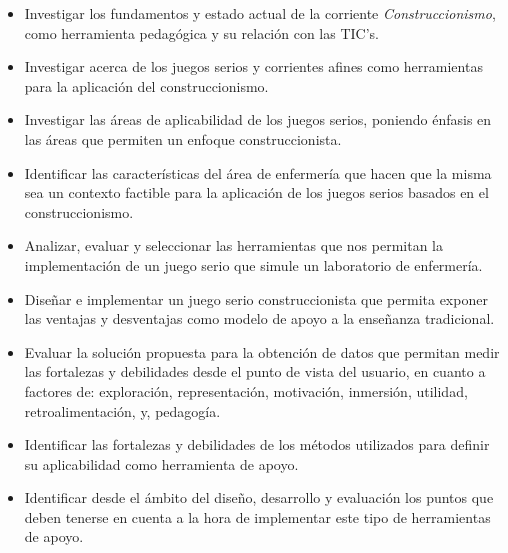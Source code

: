 \begin{itemize}
    \item Investigar los fundamentos y estado actual de la corriente
        \emph{Construccionismo}, como herramienta pedagógica y su relación con
        las TIC's.

    \item Investigar acerca de los juegos serios y corrientes afines como
        herramientas para la aplicación del construccionismo.
    
    \item Investigar las áreas de aplicabilidad de los juegos serios, poniendo
        énfasis en las áreas que permiten un enfoque construccionista.
        
    \item Identificar las características del área de enfermería que hacen que
        la misma sea un contexto factible para la aplicación de los juegos
        serios basados en el construccionismo.
    
    \item Analizar, evaluar y seleccionar las herramientas que nos permitan la
        implementación de un juego serio que simule un laboratorio de
        enfermería.
        
    \item Diseñar e implementar un juego serio construccionista que permita
        exponer las ventajas y desventajas como modelo de apoyo a la enseñanza
        tradicional. 
        
    \item Evaluar la solución propuesta para la obtención de datos que permitan
        medir las fortalezas y debilidades desde el punto de vista del usuario,
        en cuanto a factores de: exploración, representación, motivación, inmersión,
        utilidad, retroalimentación, y, pedagogía.

    \item Identificar las fortalezas y debilidades de los métodos utilizados
        para definir su aplicabilidad como herramienta de apoyo. 

     \item Identificar desde el ámbito del diseño, desarrollo y evaluación los 
        puntos que deben tenerse en cuenta a la hora de implementar este tipo de 
        herramientas de apoyo.
\end{itemize}